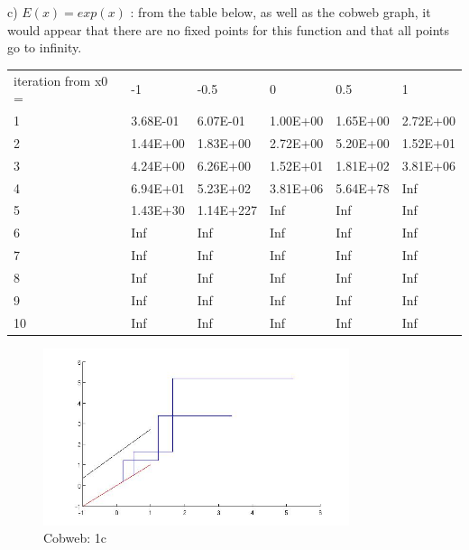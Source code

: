 \documentclass[12pt]{article}
\newenvironment{myenv}{\begin{adjustwidth}{1cm}{}}{\end{adjustwidth}}
\begin{document}
\begin{myenv}
c) $E(x) = exp(x)$ : from the table below, as well as the cobweb graph, it would appear that there are no fixed points for this function and that all points go to infinity.

\begin{table}[h]
\begin{tabular}{llllll}
iteration from x0 = & -1       & -0.5      & 0        & 0.5      & 1        \\
1                   & 3.68E-01 & 6.07E-01  & 1.00E+00 & 1.65E+00 & 2.72E+00 \\
2                   & 1.44E+00 & 1.83E+00  & 2.72E+00 & 5.20E+00 & 1.52E+01 \\
3                   & 4.24E+00 & 6.26E+00  & 1.52E+01 & 1.81E+02 & 3.81E+06 \\
4                   & 6.94E+01 & 5.23E+02  & 3.81E+06 & 5.64E+78 & Inf      \\
5                   & 1.43E+30 & 1.14E+227 & Inf      & Inf      & Inf      \\
6                   & Inf      & Inf       & Inf      & Inf      & Inf      \\
7                   & Inf      & Inf       & Inf      & Inf      & Inf      \\
8                   & Inf      & Inf       & Inf      & Inf      & Inf      \\
9                   & Inf      & Inf       & Inf      & Inf      & Inf      \\
10                  & Inf      & Inf       & Inf      & Inf      & Inf     
\end{tabular}
\end{table}

\begin{figure} [H]
    \centering
    \includegraphics[width=0.8\textwidth]{cobweb1c}
    \caption{Cobweb: 1c}
    \label{figure:a2}
\end{figure}


\end{myenv}
\end{document}
